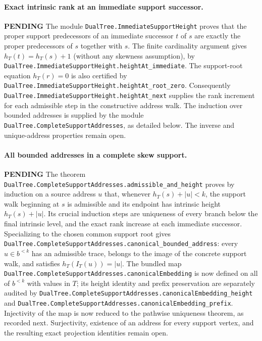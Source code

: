 \documentclass[11pt]{article}
\newcommand{\todo}{\textcolor{gray!70!black}{\textbf{PENDING}}}
\newcommand{\lean}[1]{\texttt{#1}}
\begin{document}
\paragraph{Exact intrinsic rank at an immediate support successor.} \todo
The module \lean{DualTree.ImmediateSupportHeight} proves that the
proper support predecessors of an immediate successor $t$ of $s$
are exactly the proper predecessors of $s$ together with $s$.
The finite cardinality argument gives
$h_T(t)=h_T(s)+1$ (without any skewness assumption), by
\lean{DualTree.ImmediateSupportHeight.heightAt_immediate}.
The support-root equation $h_T(r)=0$ is also certified by
\lean{DualTree.ImmediateSupportHeight.heightAt_root_zero}.
Consequently
\lean{DualTree.ImmediateSupportHeight.heightAt_next}
supplies the rank increment for each admissible step in the
constructive address walk.  The induction over bounded addresses
is supplied by the module
\lean{DualTree.CompleteSupportAddresses}, as detailed below.
The inverse and unique-address properties remain open.

\paragraph{All bounded addresses in a complete skew support.} \todo
The theorem \lean{DualTree.CompleteSupportAddresses.admissible_and_height}
proves by induction on a source address $u$ that, whenever
$h_T(s)+|u|<k$, the support walk beginning at $s$ is admissible
and its endpoint has intrinsic height $h_T(s)+|u|$.
Its crucial induction steps are uniqueness of every branch below
the final intrinsic level, and the exact rank increase at each
immediate successor.  Specializing to the chosen common support root
gives \lean{DualTree.CompleteSupportAddresses.canonical_bounded_address}:
every $u\in b^{<k}$ has an admissible trace, belongs to the image of
the concrete support walk, and satisfies
$h_T(I_T(u))=|u|$.
The bundled map \lean{DualTree.CompleteSupportAddresses.canonicalEmbedding}
is now defined on all of $b^{<k}$ with values in $T$; its height
identity and prefix preservation are separately audited by
\lean{DualTree.CompleteSupportAddresses.canonicalEmbedding_height}
and \lean{DualTree.CompleteSupportAddresses.canonicalEmbedding_prefix}.
Injectivity of the map is now reduced to the pathwise
uniqueness theorem, as recorded next.  Surjectivity,
existence of an address for every support vertex, and the resulting
exact projection identities remain open.
\end{document}
